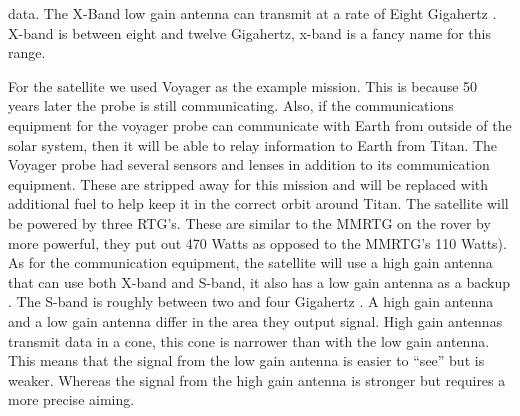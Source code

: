\documentclass[conf]{new-aiaa}
\begin{document}
{data\cite{NASA-Communications}. The X-Band low gain antenna can transmit at a rate of Eight Gigahertz \cite{NASA-Communications}. X-band is between eight and twelve Gigahertz, x-band is a fancy name for this range\cite{NASA-Basics_of_Space_Flight}.\\
\par For the satellite we used Voyager as the example mission. This is because 50 years later the probe is still communicating. Also, if the communications equipment for the voyager probe can communicate with Earth from outside of the solar system, then it will be able to relay information to Earth from Titan. The Voyager probe had several sensors and lenses in addition to its communication equipment. These are stripped away for this mission and will be replaced with additional fuel to help keep it in the correct orbit around Titan. The satellite will be powered by three RTG’s\cite{NASA-NSSDCA}. These are similar to the MMRTG on the rover by more powerful, they put out 470 Watts as opposed to the MMRTG’s 110 Watts\cite{NASA-NSSDCA}). As for the communication equipment, the satellite will use a high gain antenna that can use both X-band and S-band, it also has a low gain antenna as a backup \cite{NASA-NSSDCA}. The S-band is roughly between two and four Gigahertz \cite{NASA-Basics_of_Space_Flight}. A high gain antenna and a low gain antenna differ in the area they output signal. High gain antennas transmit data in a cone, this cone is narrower than with the low gain antenna\cite{ESA}. This means that the signal from the low gain antenna is easier to “see” but is weaker. Whereas the signal from the high gain antenna is stronger but requires a more precise aiming\cite{ESA}. 



}
\end{document}

